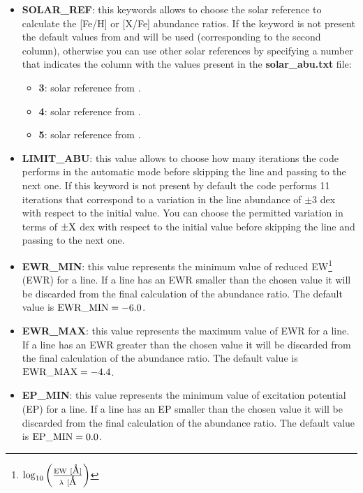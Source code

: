 \documentclass[modern]{aastex701}
\newcommand{\angstrom}{\mbox{\normalfont\AA}}
\begin{document}
\begin{itemize}
        The synthetic\_list must contain a list (to the date with very strict requirements on the names) of all the synthetic spectra that will be used for the analysis. In Sect.~\ref{sect:grid_option} will be provided a full description of how to use \texttt{salvador} with a grid of precomputed synthetic spectra.
    \item {\bf SOLAR\_REF}: this keywords allows to choose the solar reference to calculate the [Fe/H] or [X/Fe] abundance ratios. If the keyword is not present the default values from \citet{caffau_11} and \citet{lodders_10} will be used (corresponding to the second column), otherwise you can use other solar references by specifying a number that indicates the column with the values present in the {\bf solar\_abu.txt} file:
    \begin{itemize}
        \item {\bf 3}: solar reference from \citet{grevesse_98}.
        \item {\bf 4}: solar reference from \citet{magg_22}.
        \item {\bf 5}: solar reference from \citet{asplund_09}.
    \end{itemize}
    \item {\bf LIMIT\_ABU}: this value allows to choose how many iterations the code performs in the automatic mode before skipping the line and passing to the next one. If this keyword is not present by default the code performs 11 iterations that correspond to a variation in the line abundance of $\pm 3$ dex with respect to the initial value. You can choose the permitted variation in terms of $\rm \pm X$ dex with respect to the initial value before skipping the line and passing to the next one.
    \item {\bf EWR\_MIN}: this value represents the minimum value of reduced EW\footnote{$\rm \log_{10}\left(\frac{EW~[\angstrom]}{\lambda~[\angstrom}\right)$} (EWR) for a line. If a line has an EWR smaller than the chosen value it will be discarded from the final calculation of the abundance ratio. The default value is $\rm EWR\_MIN = -6.0$.
    \item {\bf EWR\_MAX}: this value represents the maximum value of EWR for a line. If a line has an EWR greater than the chosen value it will be discarded from the final calculation of the abundance ratio. The default value is $\rm EWR\_MAX = -4.4$.
    \item {\bf EP\_MIN}: this value represents the minimum value of excitation potential (EP) for a line. If a line has an EP smaller than the chosen value it will be discarded from the final calculation of the abundance ratio. The default value is $\rm EP\_MIN = 0.0$.

\end{itemize}
\end{document}
